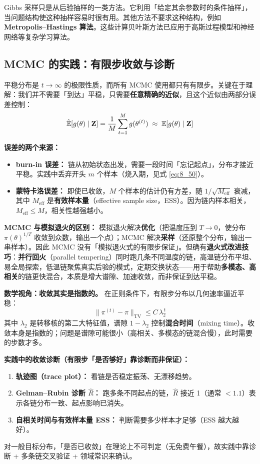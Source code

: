 Gibbs 采样只是从后验抽样的一类方法。它利用「给定其余参数时的条件抽样」，当问题结构使这种抽样容易时很有用。其他方法不要求这种结构，例如\textbf{Metropolis--Hastings 算法}。这些计算贝叶斯方法已应用于高斯过程模型和神经网络等复杂学习算法。

\subsection{MCMC 的实践：有限步收敛与诊断}

平稳分布是 $t \to \infty$ 的极限性质，而所有 MCMC 使用都只有有限步。关键在于理解：我们并不需要「到达」平稳，只需要\textbf{任意精确的近似}，且这个近似由两部分误差控制：
\[
    \hat{\mathbb{E}}[g(\theta)\mid\mathbf{Z}] = \frac{1}{M}\sum_{t=1}^{M} g(\theta^{(t)}) \;\approx\; \mathbb{E}[g(\theta)\mid\mathbf{Z}]
\]

\textbf{误差的两个来源：}
\begin{itemize}
    \item \textbf{burn-in 误差：} 链从初始状态出发，需要一段时间「忘记起点」，分布才接近平稳。实践中丢弃开头 $m$ 个样本（烧入期，见式 \eqref{eq:8_50}）。
    \item \textbf{蒙特卡洛误差：} 即使已收敛，$M$ 个样本的估计仍有方差，随 $1/\sqrt{M_{\mathrm{eff}}}$ 衰减，其中 $M_{\mathrm{eff}}$ 是\textbf{有效样本量}（effective sample size，ESS）。因为链内样本相关，$M_{\mathrm{eff}} \le M$，相关性越强越小。
\end{itemize}

\textbf{MCMC 与模拟退火的区别：} 模拟退火解决\textbf{优化}（把温度压到 $T \to 0$，使分布 $\pi(\theta)^{1/T}$ 收敛到众数，输出一个点）；MCMC 解决\textbf{采样}（还原整个分布，输出一串样本）。因此 MCMC 没有「模拟退火式的有限步保证」。但确有\textbf{退火式改进技巧}：\textbf{并行回火}（parallel tempering）同时跑几条不同温度的链，高温链分布平坦、易全局探索，低温链聚焦真实后验的模式，定期交换状态——用于帮助\textbf{多模态、高相关}的链更快混合，本质是增大谱隙、加速收敛，而非保证到达平稳。

\textbf{数学视角：收敛其实是指数的。} 在正则条件下，有限步分布以几何速率逼近平稳：
\[
    \| \pi^{(t)} - \pi \|_{\mathrm{TV}} \le C\,\lambda_2^{\,t}
\]
其中 $\lambda_2$ 是转移核的第二大特征值，谱隙 $1 - \lambda_2$ 控制\textbf{混合时间}（mixing time）。收敛本身是指数的；问题是谱隙可能很小（高相关、多模态的链混合慢），此时需要的步数才多。

\textbf{实践中的收敛诊断（有限步「是否够好」靠诊断而非保证）：}
\begin{enumerate}
    \item \textbf{轨迹图（trace plot）：} 看链是否稳定振荡、无漂移趋势。
    \item \textbf{Gelman--Rubin 诊断 $\hat{R}$：} 跑多条不同起点的链，$\hat{R}$ 接近 1（通常 $< 1.1$）表示各链分布一致、起点影响已消失。
    \item \textbf{自相关时间与有效样本量 ESS：} 判断需要多少样本才足够（ESS 越大越好）。
\end{enumerate}
对一般目标分布，「是否已收敛」在理论上不可判定（无免费午餐），故实践中靠诊断 + 多条链交叉验证 + 领域常识来确认。

